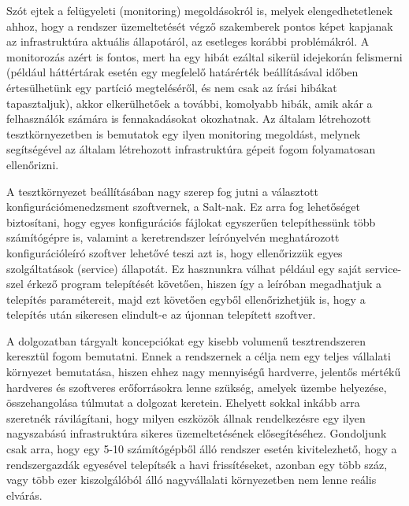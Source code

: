 Szót ejtek a felügyeleti (monitoring) megoldásokról is, melyek elengedhetetlenek ahhoz, hogy a rendszer üzemeltetését végző szakemberek pontos képet kapjanak az infrastruktúra aktuális állapotáról, az esetleges korábbi problémákról. A monitorozás azért is fontos, mert ha egy hibát ezáltal sikerül idejekorán felismerni (például háttértárak esetén egy megfelelő határérték beállításával időben értesülhetünk egy partíció megteléséről, és nem csak az írási hibákat tapasztaljuk), akkor elkerülhetőek a további, komolyabb hibák, amik akár a felhasználók számára is fennakadásokat okozhatnak. Az általam létrehozott tesztkörnyezetben is bemutatok egy ilyen monitoring megoldást, melynek segítségével az általam létrehozott infrastruktúra gépeit fogom folyamatosan ellenőrizni.

A tesztkörnyezet beállításában nagy szerep fog jutni a választott konfigurációmenedzsment szoftvernek, a Salt-nak. Ez arra fog lehetőséget biztosítani, hogy egyes konfigurációs fájlokat egyszerűen telepíthessünk több számítógépre is, valamint a keretrendszer leírónyelvén meghatározott konfigurációleíró szoftver lehetővé teszi azt is, hogy ellenőrizzük egyes szolgáltatások (service) állapotát. Ez hasznunkra válhat például egy saját service-szel érkező program telepítését követően, hiszen így a leíróban megadhatjuk a telepítés paramétereit, majd ezt követően egyből ellenőrizhetjük is, hogy a telepítés után sikeresen elindult-e az újonnan telepített szoftver.


A dolgozatban tárgyalt koncepciókat egy kisebb volumenű tesztrendszeren keresztül fogom bemutatni. Ennek a rendszernek a célja nem egy teljes vállalati környezet bemutatása, hiszen ehhez nagy mennyiségű hardverre, jelentős mértékű hardveres és szoftveres erőforrásokra lenne szükség, amelyek üzembe helyezése, összehangolása túlmutat a dolgozat keretein.
Ehelyett sokkal inkább arra szeretnék rávilágítani, hogy milyen eszközök állnak rendelkezésre egy ilyen nagyszabású infrastruktúra sikeres üzemeltetésének elősegítéséhez. Gondoljunk csak arra, hogy egy 5-10 számítógépből álló rendszer esetén kivitelezhető, hogy a rendszergazdák egyesével telepítsék a havi frissítéseket, azonban egy több száz, vagy több ezer kiszolgálóból álló nagyvállalati környezetben nem lenne reális elvárás.

